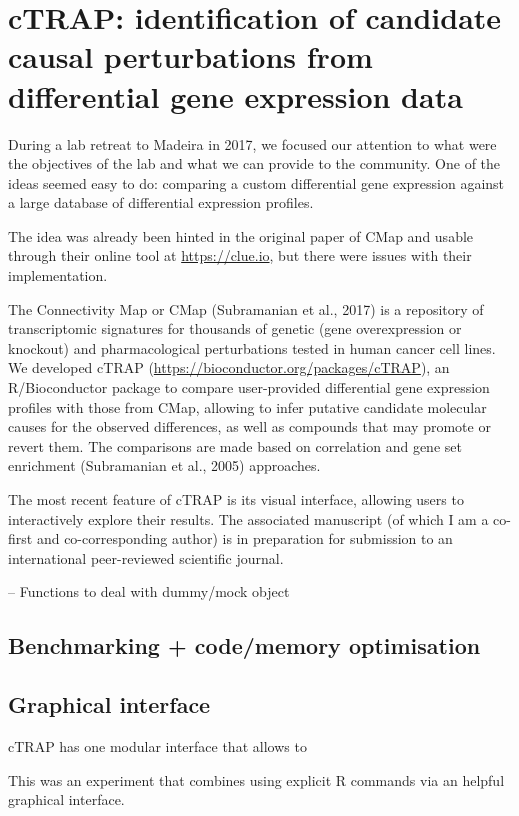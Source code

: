 \chapter{cTRAP: identification of candidate causal perturbations from differential gene expression data}
\label{chap:ctrap}

During a lab retreat to Madeira in 2017, we focused our attention to what were the objectives of the lab and what we can provide to the community. One of the ideas seemed easy to do: comparing a custom differential gene expression against a large database of differential expression profiles.

The idea was already been hinted in the original paper of CMap and usable through their online tool at \url{https://clue.io}, but there were issues with their implementation.

The Connectivity Map or CMap (Subramanian et al., 2017) is a repository of transcriptomic signatures for thousands of genetic (gene overexpression or knockout) and pharmacological perturbations tested in human cancer cell lines. We developed cTRAP (\url{https://bioconductor.org/packages/cTRAP}), an R/Bioconductor package to compare user-provided differential gene expression profiles with those from CMap, allowing to infer putative candidate molecular causes for the observed differences, as well as compounds that may promote or revert them. The comparisons are made based on correlation and gene set enrichment (Subramanian et al., 2005) approaches.

The most recent feature of cTRAP is its visual interface, allowing users to interactively explore their results. The associated manuscript (of which I am a co-first and co-corresponding author) is in preparation for submission to an international peer-reviewed scientific journal.

-- Functions to deal with dummy/mock object

\section{Benchmarking + code/memory optimisation}

\section{Graphical interface}

cTRAP has one modular interface that allows to 

This was an experiment that combines using explicit R commands via an helpful graphical interface.


